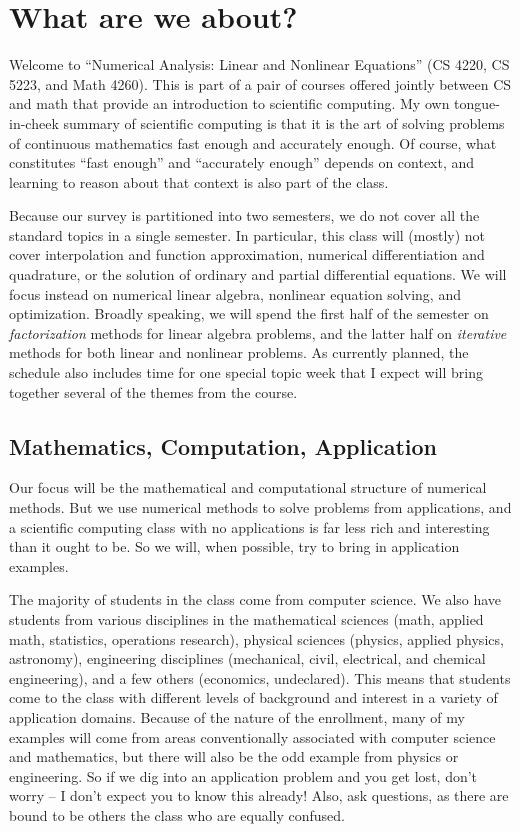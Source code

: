 \section{What are we about?}

Welcome to ``Numerical Analysis: Linear and Nonlinear Equations'' (CS
4220, CS 5223, and Math 4260).  This is part of a pair of courses
offered jointly between CS and math that provide an introduction to
scientific computing.  My own tongue-in-cheek summary of scientific
computing is that it is the art of solving problems of continuous
mathematics fast enough and accurately enough.  Of course, what
constitutes ``fast enough'' and ``accurately enough'' depends on
context, and learning to reason about that context is also part of the
class.

Because our survey is partitioned into two semesters, we do not cover
all the standard topics in a single semester.  In particular, this class
will (mostly) not cover interpolation and function approximation,
numerical differentiation and quadrature, or the solution of ordinary
and partial differential equations.  We will focus instead on numerical
linear algebra, nonlinear equation solving, and optimization.  Broadly
speaking, we will spend the first half of the semester on {\em
factorization} methods for linear algebra problems, and the latter half
on {\em iterative} methods for both linear and nonlinear problems.  As
currently planned, the schedule also includes time for one special topic
week that I expect will bring together several of the themes from the
course.

\subsection{Mathematics, Computation, Application}

Our focus will be the mathematical and computational structure of
numerical methods.  But we use numerical methods to solve
problems from applications, and a scientific computing class with
no applications is far less rich and interesting than it ought to be.
So we will, when possible, try to bring in application examples.

The majority of students in the class come from computer science.  We
also have students from various disciplines in the mathematical
sciences (math, applied math, statistics, operations research),
physical sciences (physics, applied physics, astronomy), engineering
disciplines (mechanical, civil, electrical, and chemical engineering),
and a few others (economics, undeclared).  This means that students
come to the class with different levels of background and interest in
a variety of application domains.  Because of the nature of the
enrollment, many of my examples will come from areas conventionally
associated with computer science and mathematics, but there will also
be the odd example from physics or engineering.  So if we dig into an
application problem and you get lost, don't worry -- I don't expect
you to know this already!  Also, ask questions, as there are bound to
be others the class who are equally confused.

